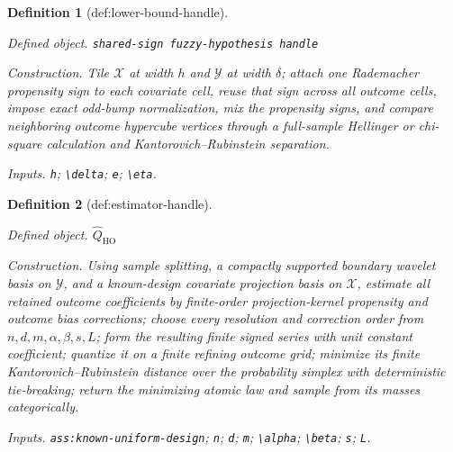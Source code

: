 \documentclass{article}
\newtheorem{definition}{Definition}
\begin{document}
\begin{definition}[def:lower-bound-handle]\label{def:lower-bound-handle}
\par\smallskip\noindent\emph{Defined object.} \texttt{shared-\allowbreak{}sign fuzzy-\allowbreak{}hypothesis handle}
\par\smallskip\noindent\emph{Construction.} Tile \(\mathcal X\) at width \(h\) and \(\mathcal Y\) at width \(\delta\); attach one Rademacher propensity sign to each covariate cell, reuse that sign across all outcome cells, impose exact odd-bump normalization, mix the propensity signs, and compare neighboring outcome hypercube vertices through a full-sample Hellinger or chi-square calculation and Kantorovich--Rubinstein separation.
\par\smallskip\noindent\emph{Inputs.} \texttt{h}; \texttt{\textbackslash{}\allowbreak{}delta}; \texttt{e}; \texttt{\textbackslash{}\allowbreak{}eta}.
\end{definition}

\begin{definition}[def:estimator-handle]\label{def:estimator-handle}
\par\smallskip\noindent\emph{Defined object.} \(\widehat Q_{\mathrm{HO}}\)
\par\smallskip\noindent\emph{Construction.} Using sample splitting, a compactly supported boundary wavelet basis on \(\mathcal Y\), and a known-design covariate projection basis on \(\mathcal X\), estimate all retained outcome coefficients by finite-order projection-kernel propensity and outcome bias corrections; choose every resolution and correction order from \(n,d,m,\alpha,\beta,s,L\); form the resulting finite signed series with unit constant coefficient; quantize it on a finite refining outcome grid; minimize its finite Kantorovich--Rubinstein distance over the probability simplex with deterministic tie-breaking; return the minimizing atomic law and sample from its masses categorically.
\par\smallskip\noindent\emph{Inputs.} \texttt{ass:\allowbreak{}known-\allowbreak{}uniform-\allowbreak{}design}; \texttt{n}; \texttt{d}; \texttt{m}; \texttt{\textbackslash{}\allowbreak{}alpha}; \texttt{\textbackslash{}\allowbreak{}beta}; \texttt{s}; \texttt{L}.
\end{definition}
\end{document}
